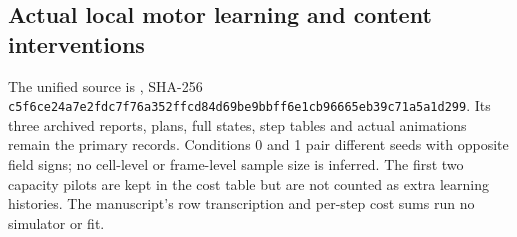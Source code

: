 \subsection*{Actual local motor learning and content interventions}
The unified source is , SHA-256 \texttt{c5f6ce24\allowbreak{}a7e2fdc7\allowbreak{}f76a352f\allowbreak{}fcd84d69\allowbreak{}be9bbff6\allowbreak{}e1cb9666\allowbreak{}5eb39c71\allowbreak{}a5a1d299}. Its three archived reports, plans, full states, step tables and actual animations remain the primary records. Conditions 0 and 1 pair different seeds with opposite field signs; no cell-level or frame-level sample size is inferred. The first two capacity pilots are kept in the cost table but are not counted as extra learning histories. The manuscript's row transcription and per-step cost sums run no simulator or fit.

